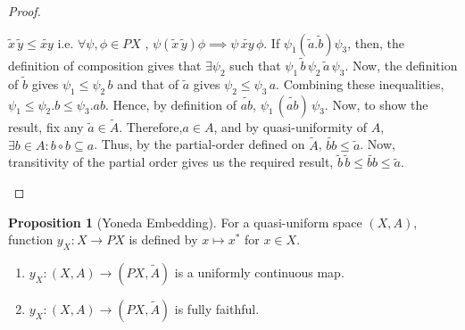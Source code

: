 \documentclass[18pt,a4paper]{article}
\theoremstyle{definition}
\newtheorem{proop}[theorem]{Proposition}
\begin{document}
\begin{proof}
\begin{enumerate}[label=(\roman*)]
			$\tilde{x} \, \tilde{y} \leq \widetilde{xy}$
			i.e. $\forall \psi, \phi \in PX$ , $\psi(\tilde{x} \, \tilde{y})\phi \implies
			\psi \, \widetilde{xy} \, \phi $.
			If $\psi_1(\tilde{a} .\tilde{b} )\psi_3$, then, the definition of composition
			gives that $\exists \psi_2$ such that $\psi_1 \, \tilde{b} \, \psi_2 \,
			\tilde{a} \, \psi_3$. Now, the definition of $\tilde{b}$ gives $\psi_1 \leq \psi_2
			\,b$ and that of $\tilde{a}$ gives $\psi_2 \leq \psi_3 \, a$. Combining
			these inequalities, $\psi_1 \leq \psi_2.b \leq \psi_3.ab$.
			Hence, by definition of	$\widetilde{ab}$, $\psi_1 \,(\widetilde{ab})\,\psi_3$.
			Now, to show the result, fix any $\tilde{a}\in \tilde{A}$. Therefore,$a\in A$, and
			by quasi-uniformity of $A$, $\exists b \in A: b \circ b \subseteq
			a$. Thus, by the partial-order defined on $\tilde{A}$, $\widetilde{bb} \leq \tilde{a}$.
			Now, transitivity of the partial order gives us the required result,
			$ \tilde{b} \, \tilde{b} \leq \widetilde{bb} \leq \tilde{a}$. \qedhere
	\end{enumerate}
\end{proof}
\begin{proop}[Yoneda Embedding]
\item For a quasi-uniform space $(X,A)$, function $y_X:X \to PX$ is defined by $x\mapsto x^*$ for $x \in X$.
	\begin{enumerate}[label=(\alph*)]
		\item $y_X:(X,A) \rightarrow (PX,\tilde{A})$ is a uniformly continuous map.
		\item $y_X:(X,A) \rightarrow (PX,\tilde{A})$ is fully faithful.
	\end{enumerate}
\end{proop}
\end{document}
